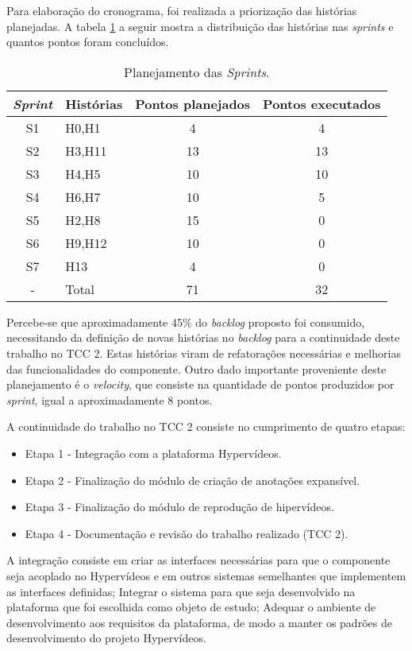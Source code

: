 Para elaboração do cronograma, foi realizada a priorização das histórias planejadas. A tabela \ref{tab:plan} a seguir mostra a distribuição das histórias nas \textit{sprints} e quantos pontos foram concluídos.

\begin{table}[h!]
	\centering
	\begin{tabular}{| c | p{4cm} | c | c |}
		\hline
		\textit{Sprint} & Histórias & Pontos planejados & Pontos executados \\
		\hline
		\hline
		S1 & H0,H1  & 4 & 4 \\
		\hline
		S2 & H3,H11 & 13 & 13 \\
		\hline		
		S3 & H4,H5 & 10 & 10 \\
		\hline
		S4 & H6,H7 & 10 & 5 \\
		\hline
		S5 & H2,H8 & 15 & 0 \\
		\hline
		S6 & H9,H12 & 10 & 0 \\
		\hline
		S7 & H13 & 4 & 0 \\
		\hline
		- & Total & 71 & 32 \\
		\hline
	\end{tabular}
	\caption{Planejamento das \textit{Sprints}.}
	\label{tab:plan}
\end{table}

Percebe-se que aproximadamente 45\% do \textit{backlog} proposto foi consumido, necessitando da definição de novas histórias no \textit{backlog} para a continuidade deste trabalho no TCC 2. Estas histórias viram de refatorações necessárias e melhorias das funcionalidades do componente. Outro dado importante proveniente deste planejamento é o \textit{velocity}, que consiste na quantidade de pontos produzidos por \textit{sprint}, igual a aproximadamente 8 pontos.

A continuidade do trabalho no TCC 2 consiste no cumprimento de quatro etapas:

\begin{itemize}
	\item Etapa 1 - Integração com a plataforma Hypervídeos.
	\item Etapa 2 - Finalização do módulo de criação de anotações expansível.
	\item Etapa 3 - Finalização do módulo de reprodução de hipervídeos.
	\item Etapa 4 - Documentação e revisão do trabalho realizado (TCC 2).
\end{itemize}

A integração consiste em criar as interfaces necessárias para que o componente seja acoplado no Hypervídeos e em outros sistemas semelhantes que implementem as interfaces definidas; Integrar o sistema para que seja desenvolvido na plataforma que foi escolhida como objeto de estudo; Adequar o ambiente de desenvolvimento aos requisitos da plataforma, de modo a manter os padrões de desenvolvimento do projeto Hypervídeos.

